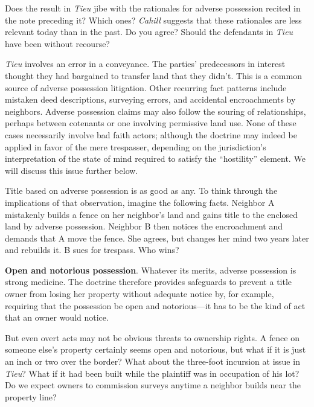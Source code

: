 
\item Does the result in \textit{Tieu} jibe with the rationales for adverse
possession recited in the note preceding it? Which ones?
\textit{Cahill} suggests that these rationales are less relevant today than in
the past. Do you agree? Should the defendants in \textit{Tieu} have been
without recourse?

\item \textit{Tieu} involves an error in a conveyance. The parties' predecessors
in interest thought they had bargained to transfer land that they didn't. This
is a common source of adverse possession litigation. Other recurring fact
patterns include mistaken deed descriptions, surveying errors, and accidental
encroachments by neighbors. Adverse possession claims may also follow the
souring of relationships, perhaps between cotenants or one involving permissive
land use. None of these cases necessarily involve bad faith actors; although
the doctrine may indeed be applied in favor of the mere trespasser, depending
on the jurisdiction's interpretation of the state of mind required to satisfy
the ``hostility'' element. We will discuss this issue further below.

\item Title based on adverse possession is as good as any. To think through the
implications of that observation, imagine the following facts. Neighbor A
mistakenly builds a fence on her neighbor's land and gains title to the
enclosed land by adverse possession. Neighbor B then notices the encroachment
and demands that A move the fence. She agrees, but changes her mind two years
later and rebuilds it. B sues for trespass. Who wins?

\item \textbf{Open and notorious possession}. Whatever its merits, adverse
possession is strong medicine. The doctrine therefore provides safeguards to
prevent a title owner from losing her property without adequate notice by, for
example, requiring that the possession be open and notorious---it has to be the
kind of act that an owner would notice. 

But even overt acts may not be obvious threats to ownership rights. A fence on
someone else's property certainly seems open and notorious, but what if it is
just an inch or two over the border? What about the three-foot incursion at
issue in \textit{Tieu}? What if it had been built while the plaintiff was in
occupation of his lot? Do we expect owners to commission surveys anytime a
neighbor builds near the property line?

